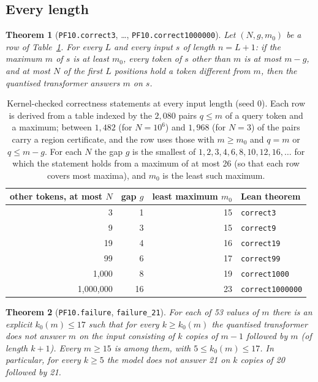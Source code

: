 \documentclass[11pt,a4paper]{article}
\newtheorem{theorem}{Theorem}
\newcommand{\lean}[1]{\texttt{#1}}
\begin{document}
\subsection{Every length}

\begin{theorem}[\lean{PF10.correct3}, \dots, \lean{PF10.correct1000000}]\label{thm:gap}
Let $(N,g,m_0)$ be a row of Table~\ref{tab:gap}. For every $L$ and every input
$s$ of length $n=L+1$: if the maximum $m$ of $s$ is at least $m_0$, every token
of $s$ other than $m$ is at most $m-g$, and at most $N$ of the first $L$
positions hold a token different from $m$, then the quantised transformer
answers $m$ on $s$.
\end{theorem}

\begin{table}[ht]
\centering
\begin{tabular}{rrr@{\qquad}l}
\toprule
other tokens, at most $N$ & gap $g$ & least maximum $m_0$ & Lean theorem\\
\midrule
3 & 1 & 15 & \lean{correct3}\\
9 & 3 & 15 & \lean{correct9}\\
19 & 4 & 16 & \lean{correct19}\\
99 & 6 & 17 & \lean{correct99}\\
1{,}000 & 8 & 19 & \lean{correct1000}\\
1{,}000{,}000 & 16 & 23 & \lean{correct1000000}\\
\bottomrule
\end{tabular}
\caption{Kernel-checked correctness statements at every input length (seed 0).
Each row is derived from a table indexed by the $2{,}080$ pairs $q\le m$ of a
query token and a maximum; between $1{,}482$ (for $N=10^6$) and $1{,}968$ (for
$N=3$) of the pairs carry a region certificate, and the row uses those with
$m\ge m_0$ and $q=m$ or $q\le m-g$. For each $N$ the gap $g$ is the smallest of
$1,2,3,4,6,8,10,12,16,\dots$ for which the statement holds from a maximum of at
most 26 (so that each row covers most maxima), and $m_0$ is the least such
maximum.}\label{tab:gap}
\end{table}

\begin{theorem}[\lean{PF10.failure}, \lean{failure\_21}]\label{thm:fail}
For each of 53 values of $m$ there is an explicit $k_0(m)\le 17$ such that for
every $k\ge k_0(m)$ the quantised transformer does not answer $m$ on the input
consisting of $k$ copies of $m-1$ followed by $m$ (of length $k+1$). Every
$m\ge15$ is among them, with $5\le k_0(m)\le17$. In particular, for every
$k\ge5$ the model does not answer 21 on $k$ copies of 20 followed by 21.
\end{theorem}
\end{document}
